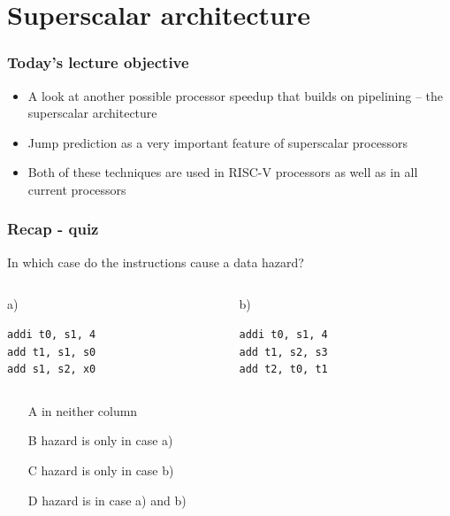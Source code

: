 \documentclass{beamer}
\subtitle{Lecture 06. Superscalar architecture\\a\\jump predictors}
\author{Pavel Píša \phantom{xxxxxxxxx} Petr Štěpán \\ \small\texttt{pisa@fel.cvut.cz}\phantom{xxxx}\small\texttt{stepan@fel.cvut.cz}}
\begin{document}
\maketitle

\section{Superscalar architecture}

\begin{frame}
\frametitle{Today's lecture objective}

\begin{itemize}
 \item A look at another possible processor speedup that builds on pipelining -- the superscalar architecture
 \item Jump prediction as a very important feature of superscalar processors
 \item Both of these techniques are used in RISC-V processors as well as in all current processors
\end{itemize}

\end{frame}

\begin{frame}[fragile]
\frametitle{Recap - quiz}

In which case do the instructions cause a data hazard?

\begin{columns}[T]
\begin{column}{0.40\textwidth}
\phantom{xxxxx}a)

\begin{verbatim}
addi t0, s1, 4
add t1, s1, s0
add s1, s2, x0
\end{verbatim}
\end{column}
\begin{column}{0.40\textwidth}
\phantom{xxxxx}b)

\begin{verbatim}
addi t0, s1, 4
add t1, s2, s3
add t2, t0, t1
\end{verbatim}
\end{column}
\end{columns}
\bigskip
\begin{itemize}
 \item[A] in neither column
 \item[B] hazard is only in case a)
 \item[C] hazard is only in case b)
 \item[D] hazard is in case a) and b)
\end{itemize}

\end{frame}
\end{document}

